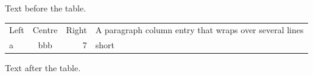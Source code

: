 \documentclass{article}
\begin{document}
Text before the table.

\begin{tabular}{lcrp{3cm}}Left & Centre & Right & A paragraph column entry that wraps over several lines\\a & bbb & 7 & short\end{tabular}

Text after the table.
\end{document}
